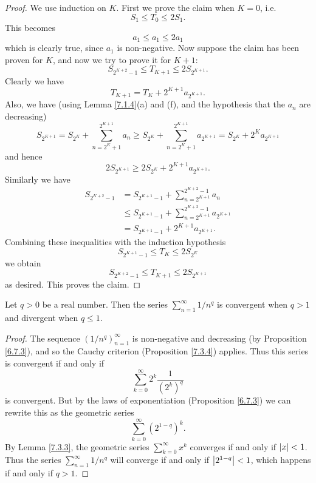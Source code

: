 \begin{proof}
    We use induction on \(K\).
    First we prove the claim when \(K = 0\), i.e.
    \[
        S_1 \leq T_0 \leq 2S_1.
    \]
    This becomes
    \[
        a_1 \leq a_1 \leq 2a_1
    \]
    which is clearly true, since \(a_1\) is non-negative.
    Now suppose the claim has been proven for \(K\), and now we try to prove it for \(K + 1\):
    \[
        S_{2^{K + 2} - 1} \leq T_{K + 1} \leq 2S_{2^{K + 1}}.
    \]
    Clearly we have
    \[
        T_{K + 1} = T_K + 2^{K + 1} a_{2^{K + 1}}.
    \]
    Also, we have
    (using Lemma \ref{7.1.4}(a) and (f), and the hypothesis that the \(a_n\) are decreasing)
    \[
        S_{2^{K + 1}} = S_{2^K} + \sum_{n = 2^K + 1}^{2^{K + 1}} a_n \geq S_{2^K} + \sum_{n = 2^K + 1}^{2^{K + 1}} a_{2^{K + 1}} = S_{2^K} + 2^K a_{2^{K + 1}}
    \]
    and hence
    \[
        2S_{2^{K + 1}} \geq 2S_{2^K} + 2^{K + 1} a_{2^{K + 1}}.
    \]
    Similarly we have
    \begin{align*}
        S_{2^{K + 2} - 1} & = S_{2^{K + 1} - 1} + \sum_{n = 2^{K + 1}}^{2^{K + 2} - 1} a_n              \\
                          & \leq S_{2^{K + 1} - 1} + \sum_{n = 2^{K + 1}}^{2^{K + 2} - 1} a_{2^{K + 1}} \\
                          & = S_{2^{K + 1} - 1} + 2^{K + 1} a_{2^{K + 1}}.
    \end{align*}
    Combining these inequalities with the induction hypothesis
    \[
        S_{2^{K + 1} - 1} \leq T_K \leq 2S_{2^K}
    \]
    we obtain
    \[
        S_{2^{K + 2} - 1} \leq T_{K + 1} \leq 2S_{2^{K + 1}}
    \]
    as desired.
    This proves the claim.
\end{proof}

\begin{corollary}\label{7.3.7}
    Let \(q > 0\) be a real number.
    Then the series \(\sum_{n = 1}^\infty 1 / n^q\) is convergent when \(q > 1\) and divergent when \(q \leq 1\).
\end{corollary}

\begin{proof}
    The sequence \((1 / n^q)_{n = 1}^\infty\) is non-negative and decreasing (by Proposition \ref{6.7.3}), and so the Cauchy criterion (Proposition \ref{7.3.4}) applies.
    Thus this series is convergent if and only if
    \[
        \sum_{k = 0}^\infty 2^k \frac{1}{(2^k)^q}
    \]
    is convergent.
    But by the laws of exponentiation (Proposition \ref{6.7.3}) we can rewrite this as the geometric series
    \[
        \sum_{k = 0}^\infty (2^{1 - q})^k.
    \]
    By Lemma \ref{7.3.3}, the geometric series \(\sum_{k = 0}^\infty x^k\) converges if and only if \(\abs*{x} < 1\).
    Thus the series \(\sum_{n = 1}^\infty 1 / n^q\) will converge if and only if \(\abs*{2^{1 - q}} < 1\), which happens if and only if \(q > 1\).
\end{proof}

